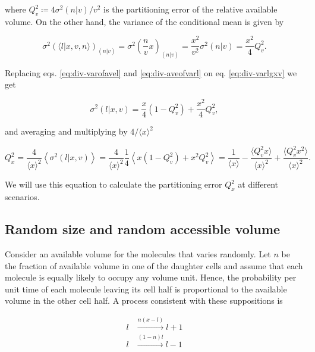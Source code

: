 where $Q_v^2 \coloneqq 4\sigma^2(n|v)/v^2$ is the partitioning error of the relative available volume. On the other hand, the variance of the conditional mean is given by

\begin{equation}
  \label{eq:div-aveofvarl}
  \sigma^2\left(\langle l|x,v,n\rangle\right)_{(n|v)} = \sigma^2\left(\frac{n}{v}x\right)_{(n|v)} = \frac{x^2}{v^2}\sigma^2(n|v) = \frac{x^2}{4}Q_v^2.
\end{equation}

Replacing eqs. \eqref{eq:div-varofavel} and \eqref{eq:div-aveofvarl} on eq. \eqref{eq:div-varlgxv} we get

\begin{equation*}
  \sigma^2(l|x,v) = \frac{x}{4}(1-Q_v^2)+\frac{x^2}{4}Q_v^2,
\end{equation*}

and averaging and multiplying by $4/\langle x\rangle^2$

\begin{equation}
  \label{eq:div-Qdis}
  Q_x^2 = \frac{4}{\langle x\rangle^2}\left\langle\sigma^2(l|x,v)\right\rangle = \frac{4}{\langle x\rangle^2}\frac{1}{4}\left\langle x(1-Q_v^2) + x^2Q_v^2 \right\rangle = \frac{1}{\langle x\rangle} - \frac{\langle Q_v^2x\rangle}{\langle x\rangle^2} + \frac{\langle Q_v^2x^2\rangle}{\langle x\rangle^2}.
\end{equation}

We will use this equation to calculate the partitioning error $Q_x^2$ at different scenarios.

\subsection{Random size and random accessible volume}

Consider an available volume for the molecules that varies randomly. Let $n$ be the fraction of available volume in one of the daughter cells and assume that each molecule is equally likely to occupy any volume unit. Hence, the probability per unit time of each molecule leaving its cell half is proportional to the available volume in the other cell half. A process consistent with these suppositions is

\begin{equation*}
  \begin{split}
    l&\xrightarrow{n(x-l)}l+1\\
    l&\xrightarrow{(1-n)l}l-1
  \end{split}
\end{equation*}

